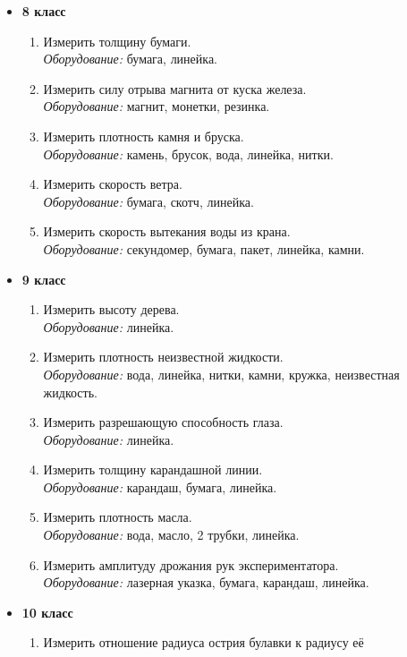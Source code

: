 \documentclass[12pt,a4paper,oneside]{scrartcl}
\newlength{\h}
\newlength{\x}
\begin{document}
\begin{itemize}
\item \textbf{8 класс}
  \begin{enumerate}
  \item Измерить толщину бумаги.\\
    \textit{Оборудование:} бумага, линейка.
  \item Измерить силу отрыва магнита от куска железа. \\
    \textit{Оборудование:} магнит, монетки, резинка.
  \item Измерить плотность камня и бруска.\\
    \textit{Оборудование:} камень, брусок, вода, линейка, нитки.
  \item Измерить скорость ветра.\\
    \textit{Оборудование:} бумага, скотч, линейка.
  \item Измерить скорость вытекания воды из крана.\\
    \textit{Оборудование:} секундомер, бумага, пакет, линейка, камни.
  \end{enumerate}
\item \textbf{9 класс}
  \begin{enumerate}
  \item Измерить высоту дерева. \\
    \textit{Оборудование:} линейка.
  \item Измерить плотность неизвестной жидкости.\\
    \textit{Оборудование:} вода, линейка, нитки, камни, кружка,
    неизвестная жидкость.
  \item Измерить разрешающую способность глаза. \\
    \textit{Оборудование:} линейка.
  \item Измерить толщину карандашной линии. \\
    \textit{Оборудование:} карандаш, бумага, линейка.
  \item Измерить плотность масла. \\
    \textit{Оборудование:} вода, масло, 2 трубки, линейка.
  \item Измерить амплитуду дрожания рук экспериментатора. \\
    \textit{Оборудование:} лазерная указка, бумага, карандаш, линейка.
  \end{enumerate}
\item \textbf{10 класс}
  \begin{enumerate}
  \item Измерить отношение радиуса острия булавки к радиусу её

\end{enumerate}
\end{itemize}
\end{document}
